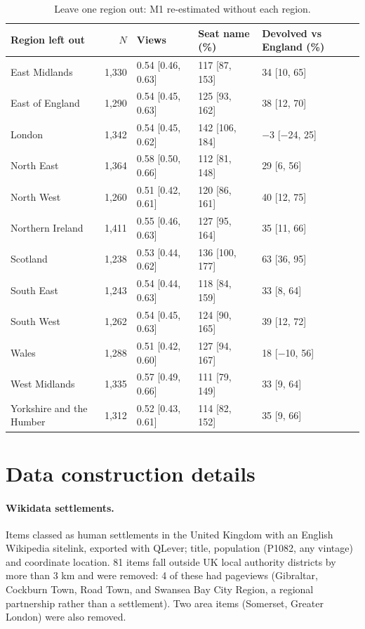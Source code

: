 \documentclass[11pt,a4paper]{article}
\begin{document}
\begin{table}[tbp]\centering\small\caption{Leave one region out: M1 re-estimated without each region.}\label{tab:loro}\begin{tabular}{lrlll}\toprule Region left out & $N$ & Views & Seat name (\%) & Devolved vs England (\%)\\\midrule
East Midlands & 1,330 & 0.54 [0.46, 0.63] & 117 [87, 153] & 34 [10, 65]\\
East of England & 1,290 & 0.54 [0.45, 0.63] & 125 [93, 162] & 38 [12, 70]\\
London & 1,342 & 0.54 [0.45, 0.62] & 142 [106, 184] & $-$3 [$-$24, 25]\\
North East & 1,364 & 0.58 [0.50, 0.66] & 112 [81, 148] & 29 [6, 56]\\
North West & 1,260 & 0.51 [0.42, 0.61] & 120 [86, 161] & 40 [12, 75]\\
Northern Ireland & 1,411 & 0.55 [0.46, 0.63] & 127 [95, 164] & 35 [11, 66]\\
Scotland & 1,238 & 0.53 [0.44, 0.62] & 136 [100, 177] & 63 [36, 95]\\
South East & 1,243 & 0.54 [0.44, 0.63] & 118 [84, 159] & 33 [8, 64]\\
South West & 1,262 & 0.54 [0.45, 0.63] & 124 [90, 165] & 39 [12, 72]\\
Wales & 1,288 & 0.51 [0.42, 0.60] & 127 [94, 167] & 18 [$-$10, 56]\\
West Midlands & 1,335 & 0.57 [0.49, 0.66] & 111 [79, 149] & 33 [9, 64]\\
Yorkshire and the Humber & 1,312 & 0.52 [0.43, 0.61] & 114 [82, 152] & 35 [9, 66]\\
\bottomrule\end{tabular}\end{table}
\section{Data construction details}
\label{app:data}
\paragraph{Wikidata settlements.} Items classed as human settlements in the United Kingdom with an English Wikipedia sitelink, exported with QLever; title, population (P1082, any vintage) and coordinate location. 81 items fall outside UK local authority districts by more than 3 km and were removed: 4 of these had pageviews (Gibraltar, Cockburn Town, Road Town, and Swansea Bay City Region, a regional partnership rather than a settlement). Two area items (Somerset, Greater London) were also removed.
\end{document}
